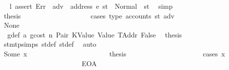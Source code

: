 \begin{isabellebody}
\ \isamarkupfalse%
\ l{}{\isacharcolon}{\kern0pt}\ {\isachardoublequoteopen}assert\ Err\ {\isacharparenleft}{\kern0pt}{\isasymlambda}{\isacharunderscore}{\kern0pt}{\isachardot}{\kern0pt}\ adv\ {\isasymnoteq}\ address\ e{\isacharparenright}{\kern0pt}\ st{\isacharprime}{\kern0pt}{\isacharprime}{\kern0pt}\ {\isacharequal}{\kern0pt}\ Normal\ {\isacharparenleft}{\kern0pt}{\isacharparenleft}{\kern0pt}{\isacharparenright}{\kern0pt}{\isacharcomma}{\kern0pt}\ st{\isacharprime}{\kern0pt}{\isacharprime}{\kern0pt}{\isacharparenright}{\kern0pt}{\isachardoublequoteclose}\ \isamarkupfalse%
\ simp\isanewline
\ \ \ \ \ \ \ \ \ \ \ \ \ \ \ \ \ \ \isamarkupfalse%
\ \isamarkupfalse%
\ {\isacharquery}{\kern0pt}thesis\isanewline
\ \ \ \ \ \ \ \ \ \ \ \ \ \ \ \ \ \ \isamarkupfalse%
\ {\isacharparenleft}{\kern0pt}cases\ {\isachardoublequoteopen}type\ {\isacharparenleft}{\kern0pt}accounts\ st{\isacharprime}{\kern0pt}{\isacharprime}{\kern0pt}\ adv{\isacharparenright}{\kern0pt}{\isachardoublequoteclose}{\isacharparenright}{\kern0pt}\isanewline
\ \ \ \ \ \ \ \ \ \ \ \ \ \ \ \ \ \ \ \ \isamarkupfalse%
\ None\isanewline
\ \ \ \ \ \ \ \ \ \ \ \ \ \ \ \ \ \ \ \ \isamarkupfalse%
\ {}{\isacharparenleft}{\kern0pt}{}{\isacharparenright}{\kern0pt}\ g{\isacharunderscore}{\kern0pt}def\ a{}\ gcost\ n\ Pair\ KValue\ Value\ TAddr\ False\ \isamarkupfalse%
\ {\isacharquery}{\kern0pt}thesis\ \isamarkupfalse%
\ stmt{\isachardot}{\kern0pt}psimps{\isacharparenleft}{\kern0pt}{}{\isacharparenright}{\kern0pt}\ st{\isacharprime}{\kern0pt}{\isacharunderscore}{\kern0pt}def\ st{\isacharprime}{\kern0pt}{\isacharprime}{\kern0pt}{\isacharunderscore}{\kern0pt}def\ \isamarkupfalse%
\ auto\isanewline
\ \ \ \ \ \ \ \ \ \ \ \ \ \ \ \ \ \ \isamarkupfalse%
\isanewline
\ \ \ \ \ \ \ \ \ \ \ \ \ \ \ \ \ \ \ \ \isamarkupfalse%
\ {\isacharparenleft}{\kern0pt}Some\ x{}{\isacharparenright}{\kern0pt}\isanewline
\ \ \ \ \ \ \ \ \ \ \ \ \ \ \ \ \ \ \ \ \isamarkupfalse%
\ \isamarkupfalse%
\ {\isacharquery}{\kern0pt}thesis\isanewline
\ \ \ \ \ \ \ \ \ \ \ \ \ \ \ \ \ \ \ \ \isamarkupfalse%
\ {\isacharparenleft}{\kern0pt}cases\ x{}{\isacharparenright}{\kern0pt}\isanewline
\ \ \ \ \ \ \ \ \ \ \ \ \ \ \ \ \ \ \ \ \ \ \isamarkupfalse%
\ EOA\isanewline
\ \ \ \ \ \ \ \ \ \ \ \ \ \ \ \ \ \ \ \ \ \ \isamarkupfalse%

\end{isabellebody}
